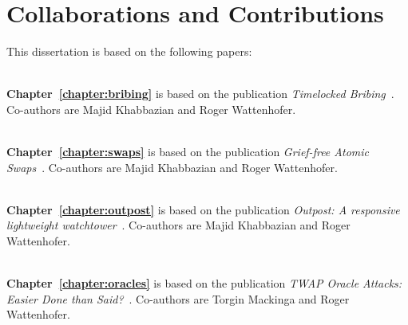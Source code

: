\section*{Collaborations and Contributions}

\newcommand\chapterlistheader[1]{~\\ \noindent\textbf{\mbox{#1}}}

This dissertation is based on the following papers:

\chapterlistheader{Chapter~\ref{chapter:bribing}} is based on the publication \emph{Timelocked Bribing}~\cite{timelocked_bribing}. Co-authors are Majid Khabbazian and Roger Wattenhofer.

\chapterlistheader{Chapter~\ref{chapter:swaps}} is based on the publication \emph{Grief-free Atomic Swaps}~\cite{grief_free_atomic_swaps}. Co-authors are Majid Khabbazian and Roger Wattenhofer.


\chapterlistheader{Chapter~\ref{chapter:outpost}} is based on the publication \emph{Outpost: A responsive lightweight watchtower}~\cite{outpost}. Co-authors are Majid Khabbazian and Roger Wattenhofer.

\chapterlistheader{Chapter~\ref{chapter:oracles}} is based on the publication \emph{TWAP Oracle Attacks: Easier Done than Said?}~\cite{twap_oracle_attacks}. Co-authors are Torgin Mackinga and Roger Wattenhofer.

\afterpage{\blankpage}